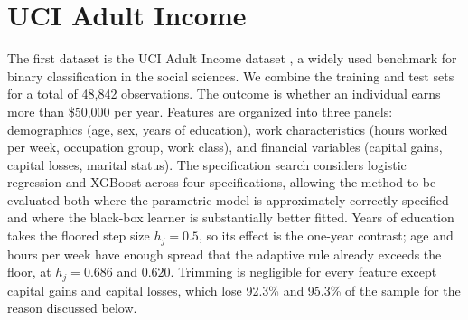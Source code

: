 \documentclass[12pt,a4paper]{article}
\numberwithin{equation}{section}
\theoremstyle{plain}
\theoremstyle{definition}
\begin{document}
	\section{UCI Adult Income}
	\label{app:adult}
	
	The first dataset is the UCI Adult Income dataset \citep{UCI, kohavi1996}, a widely used benchmark for binary classification in the social sciences. We combine the training and test sets for a total of 48,842 observations. The outcome is whether an individual earns more than \$50,000 per year. Features are organized into three panels: demographics (age, sex, years of education), work characteristics (hours worked per week, occupation group, work class), and financial variables (capital gains, capital losses, marital status). The specification search considers logistic regression and XGBoost across four specifications, allowing the method to be evaluated both where the parametric model is approximately correctly specified and where the black-box learner is substantially better fitted. Years of education takes the floored step size $h_j = 0.5$, so its effect is the one-year contrast; age and hours per week have enough spread that the adaptive rule already exceeds the floor, at $h_j = 0.686$ and $0.620$. Trimming is negligible for every feature except capital gains and capital losses, which lose 92.3\% and 95.3\% of the sample for the reason discussed below.
	
\end{document}
